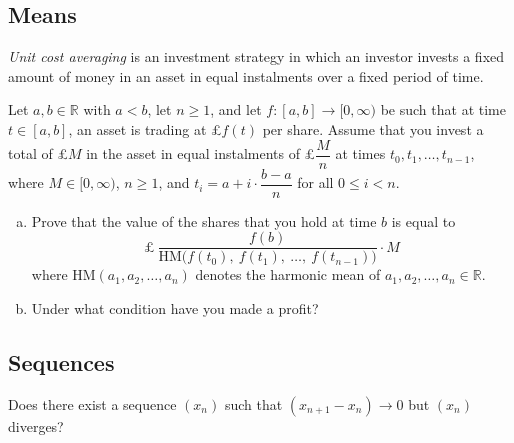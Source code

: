 \subsection*{Means}

\begin{chapex}
\textit{Unit cost averaging} is an investment strategy in which an investor invests a fixed amount of money in an asset in equal instalments over a fixed period of time.

Let $a,b \in \mathbb{R}$ with $a<b$, let $n \ge 1$, and let $f : [a,b] \to [0,\infty)$ be such that at time $t \in [a,b]$, an asset is trading at £$f(t)$ per share. Assume that you invest a total of £$M$ in the asset in equal instalments of £$\dfrac{M}{n}$ at times $t_0, t_1, \dots, t_{n-1}$, where $M \in [0,\infty)$, $n \ge 1$, and $t_i = a + i \cdot \dfrac{b-a}{n}$ for all $0 \le i < n$.

\begin{enumerate}[(a)]
\item Prove that the value of the shares that you hold at time $b$ is equal to
\[ \text{£}~\dfrac{f(b)}{\mathrm{HM} \big ( f(t_0),~ f(t_1),~ \dots,~ f(t_{n-1}) \big)} \cdot M \]
where $\mathrm{HM}(a_1,a_2,\dots,a_n)$ denotes the harmonic mean of $a_1,a_2,\dots,a_n \in \mathbb{R}$.

\item Under what condition have you made a profit?
\end{enumerate}
\end{chapex}

\subsection*{Sequences}

\begin{chapex}
Does there exist a sequence $(x_n)$ such that $(x_{n+1} - x_n) \to 0$ but $(x_n)$ diverges?
\end{chapex}